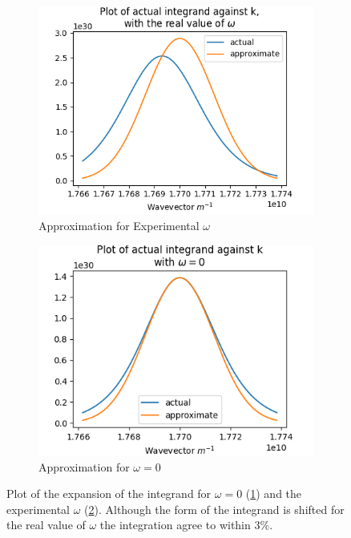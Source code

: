 \begin{figure}[htbp]
    \centering
    \begin{subfigure}{0.45\linewidth}
        \centering
        \includegraphics[width =0.9 \linewidth]{Figures/Redfield/real omega fermi k expansion.png}
        \caption{Approximation for Experimental \(\omega \)
        }\label{sub@fig:omega zero expansion}
    \end{subfigure}
    \begin{subfigure}{0.45\linewidth}
        \centering
        \includegraphics[width = 0.9\linewidth]{Figures/Redfield/zero omega fermi k expansion.png}
        \caption{Approximation for \(\omega = 0\)
        }\label{sub@fig:omega not zero expansion}
    \end{subfigure}
    \caption{
        Plot of the expansion of
        the integrand for \(\omega = 0\)
        (\cref{sub@fig:omega zero expansion})
        and the experimental \(\omega \)
        (\cref{sub@fig:omega not zero expansion}).
        Although the form of the
        integrand is shifted for the
        real value of \(\omega \)
        the integration
        agree
        to within \(3\% \).
    }\label{fig:expansion about kf}
\end{figure}
